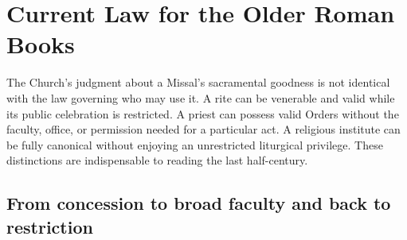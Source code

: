 \section{Current Law for the Older Roman Books}

The Church's judgment about a Missal's sacramental goodness is not identical with the law governing who may use it. A rite can be venerable and valid while its public celebration is restricted. A priest can possess valid Orders without the faculty, office, or permission needed for a particular act. A religious institute can be fully canonical without enjoying an unrestricted liturgical privilege. These distinctions are indispensable to reading the last half-century.

\subsection{From concession to broad faculty and back to restriction}

